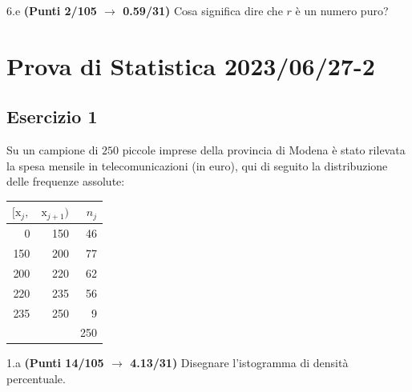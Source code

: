 \documentclass[
  11pt,
]{book}
\theoremstyle{mytheoremstyle}
\theoremstyle{mydefstyle}
\begin{document}
6.e \textbf{(Punti 2/105 \(\rightarrow\) 0.59/31)} Cosa significa dire che \(r\) è un numero puro?

\section{Prova di Statistica 2023/06/27-2}\label{prova-di-statistica-20230627-2}

\subsection{Esercizio 1}\label{esercizio-1-30}

Su un campione di \(250\) piccole imprese della provincia di Modena è stato rilevata la spesa mensile in telecomunicazioni (in euro), qui di seguito
la distribuzione delle frequenze assolute:

\begin{table}[H]
\centering
\begin{tabular}{rrr}
\toprule
$[\text{x}_j,$ & $\text{x}_{j+1})$ & $n_j$\\
\midrule
0 & 150 & 46\\
150 & 200 & 77\\
200 & 220 & 62\\
220 & 235 & 56\\
235 & 250 & 9\\
 &  & 250\\
\bottomrule
\end{tabular}
\end{table}

1.a \textbf{(Punti 14/105 \(\rightarrow\) 4.13/31)} Disegnare l'istogramma di densità percentuale.
\end{document}
